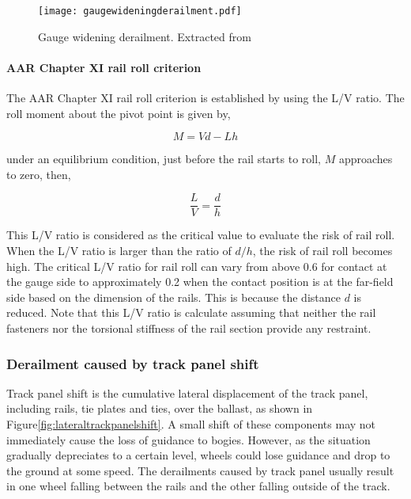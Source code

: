 \begin{figure}[h]
	\centering
	\texttt{[image: gaugewideningderailment.pdf]}
	\caption{Gauge widening derailment. Extracted from \cite[Figure8.18]{iwnicki2006handbook}}
	\label{fig:gaugewideningderailment}
\end{figure}

\paragraph{AAR Chapter XI rail roll criterion}
The AAR Chapter XI rail roll criterion is established by using the L/V ratio. The roll moment about the pivot point is given by,

\begin{equation}
	M=Vd-Lh
\end{equation}

under an equilibrium condition, just before the rail starts to roll, $M$ approaches to zero, then,

\begin{equation}
	\frac{L}{V}=\frac{d}{h}
\end{equation}

This L/V ratio is considered as the critical value to evaluate the risk of rail roll. When the L/V ratio is larger than the ratio of $d/h$, the risk of rail roll becomes high. The critical L/V ratio for rail roll can vary from above 0.6 for contact at the gauge side to approximately 0.2 when the contact position is at the far-field side based on the dimension of the rails. This is because the distance $d$ is reduced. Note that this L/V ratio is calculate assuming that neither the rail fasteners nor the torsional stiffness of the rail section provide any restraint.

\subsubsection{Derailment caused by track panel shift}
Track panel shift is the cumulative lateral displacement of the track panel, including rails, tie plates and ties, over the ballast, as shown in Figure\ref{fig:lateraltrackpanelshift}. A small shift of these components may not immediately cause the loss of guidance to bogies. However, as the situation gradually depreciates to a certain level, wheels could lose guidance and drop to the ground at some speed. The derailments caused by track panel usually result in one wheel falling between the rails and the other falling outside of the track.

